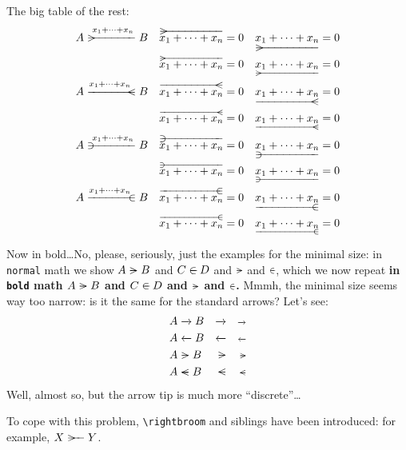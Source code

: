 \documentclass[a4paper]{article}
\newcommand*{\sumxn}{x_{1}+\dots+x_{n}}
\begin{document}
\endgroup

The big table of the rest:
\begin{align*}
	A &\xrightbroom{\sumxn} B &
			\overrightbroom {\sumxn} = 0 &&
			\underrightbroom{\sumxn} = 0 \\
		&&
			\overscriptrightbroom {\sumxn} = 0 &&
			\underscriptrightbroom{\sumxn} = 0 \\
	A &\xleftbroom{\sumxn} B &
			\overleftbroom {\sumxn} = 0 &&
			\underleftbroom{\sumxn} = 0 \\
		&&
			\overscriptleftbroom {\sumxn} = 0 &&
			\underscriptleftbroom{\sumxn} = 0 \\
	A &\xrightpitchfork{\sumxn} B &
			\overrightpitchfork {\sumxn} = 0 &&
			\underrightpitchfork{\sumxn} = 0 \\
		&&
			\overscriptrightpitchfork {\sumxn} = 0 &&
			\underscriptrightpitchfork{\sumxn} = 0 \\
	A &\xleftpitchfork{\sumxn} B &
			\overleftpitchfork {\sumxn} = 0 &&
			\underleftpitchfork{\sumxn} = 0 \\
		&&
			\overscriptleftpitchfork {\sumxn} = 0 &&
			\underscriptleftpitchfork{\sumxn} = 0 \\
\end{align*}

Now in bold\ldots\space No, please, seriously, just the examples for the minimal
size: in \texttt{normal} math we show \( A \xrightbroom{} B \) and \( C
\xleftpitchfork{} D \) and \( \overscriptrightbroom{} \) and \(
\overscriptleftpitchfork{} \), which we now repeat {\bfseries\boldmath in
\texttt{bold} math \( A \xrightbroom{} B \) and \( C \xleftpitchfork{} D \) and
\( \overscriptrightbroom{} \) and \( \overscriptleftpitchfork{} \).} Mmmh, the 
minimal size seems way too narrow: is it the same for the standard arrows?  
Let's see:
\begin{align*}
	A &\xrightarrow{} B & \overrightarrow{} && \overscriptrightarrow{} \\
	A &\xleftarrow {} B & \overleftarrow {} && \overscriptleftarrow {} \\
	A &\xrightbroom{} B & \overrightbroom{} && \overscriptrightbroom{} \\
	A &\xleftbroom {} B & \overleftbroom {} && \overscriptleftbroom {}
\end{align*}
Well, almost so, but the arrow tip is much more ``discrete''\ldots

To cope with this problem, \verb|\rightbroom| and siblings have been introduced:
for example, \( X\rightbroom Y \).
\end{document}
